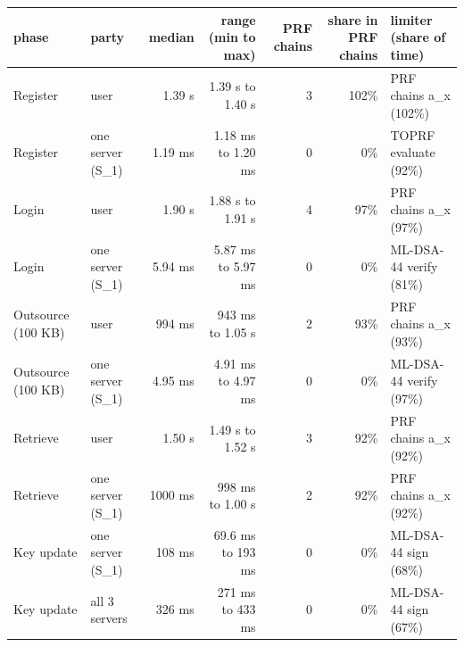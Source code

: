 \begin{tabular}{llrrrrl}
\toprule
\textbf{phase} & \textbf{party} & \textbf{median} & \textbf{range (min to max)} & \textbf{PRF chains} & \textbf{share in PRF chains} & \textbf{limiter (share of time)} \\
\midrule
Register & user & 1.39 s & 1.39 s to 1.40 s & 3 & 102\% & PRF chains a\_x (102\%) \\
Register & one server (S\_1) & 1.19 ms & 1.18 ms to 1.20 ms & 0 & 0\% & TOPRF evaluate (92\%) \\
Login & user & 1.90 s & 1.88 s to 1.91 s & 4 & 97\% & PRF chains a\_x (97\%) \\
Login & one server (S\_1) & 5.94 ms & 5.87 ms to 5.97 ms & 0 & 0\% & ML-DSA-44 verify (81\%) \\
Outsource (100 KB) & user & 994 ms & 943 ms to 1.05 s & 2 & 93\% & PRF chains a\_x (93\%) \\
Outsource (100 KB) & one server (S\_1) & 4.95 ms & 4.91 ms to 4.97 ms & 0 & 0\% & ML-DSA-44 verify (97\%) \\
Retrieve & user & 1.50 s & 1.49 s to 1.52 s & 3 & 92\% & PRF chains a\_x (92\%) \\
Retrieve & one server (S\_1) & 1000 ms & 998 ms to 1.00 s & 2 & 92\% & PRF chains a\_x (92\%) \\
Key update & one server (S\_1) & 108 ms & 69.6 ms to 193 ms & 0 & 0\% & ML-DSA-44 sign (68\%) \\
Key update & all 3 servers & 326 ms & 271 ms to 433 ms & 0 & 0\% & ML-DSA-44 sign (67\%) \\
\bottomrule
\end{tabular}
